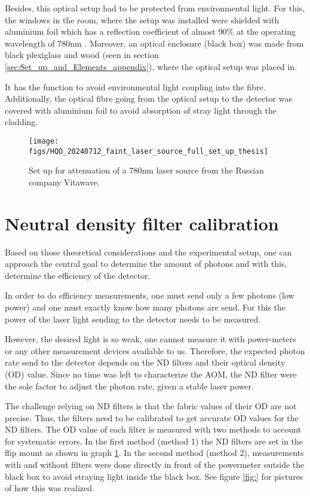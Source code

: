 Besides, this optical setup had to be protected from environmental light.
For this, the windows in the room, where the setup was installed were shielded
with aluminium foil which has a reflection coefficient of almost 90$\%$ at the operating wavelength of 780nm \cite{Alu_reflectionsgrad}.
Moreover, an optical enclosure (black box) was  made from black plexiglass and wood (seen in section \ref{sec:Set_up_and_Elements_appendix}),
where the optical setup was placed in.

It has the function to avoid environmental light coupling into the fibre.
Additionally, the optical fibre going from the optical setup to the detector was covered with aluminium foil to avoid
absorption of stray light through the cladding.\\

\begin{figure}
    \centering
    \texttt{[image: figs/HQO\_20240712\_faint\_laser\_source\_full\_set\_up\_thesis]}
    \caption{Set up for attenuation of a 780nm laser source from the Russian company Vitawave.}
    \label{fig: faint_laser_source_full_set_up}
\end{figure}

\section{Neutral density filter calibration}\label{sec:ND_filter_calibration}

Based on those theoretical considerations and the experimental setup, one can approach the central goal to determine the
amount of photons and with this, determine the efficiency of the detector.

In order to do efficiency measurements, one must send only a few photons (low power) and one must
exactly know how many photons are send.
For this the power of the laser light sending to the detector needs to be measured.

However, the desired light is so weak, one cannot measure it with power-meters or any other measurement devices available to us.
Therefore, the expected photon rate send to the detector depends on the ND filters and their optical density (OD) value.
Since no time was left to characterize the AOM, the ND filter were the sole factor to adjust the photon rate, given a stable laser power.

The challenge relying on ND filters is that the fabric values of their OD are not precise.
Thus, the filters need to be calibrated to get accurate OD values for the ND filters.
The OD value of each filter is measured with two methods to account for systematic errors.
In the first method (method 1) the ND filters are set in the flip mount as shown in graph \ref{fig: faint_laser_source_full_set_up}.
In the second method (method 2), measurements with and without filters were done directly in front of the powermeter
outside the black box to avoid straying light inside the black box.
See figure \ref{fig:} for pictures of how this was realized.

